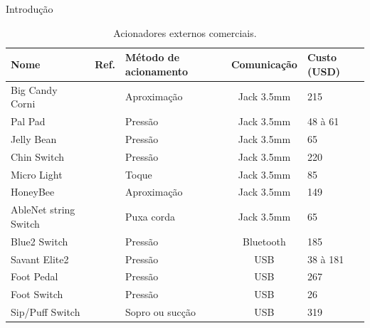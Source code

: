 \begin{chapter}{Introdução}
\begin{table}[!h]
\centering
\caption{Acionadores externos comerciais.}
\label{tab:acionadores}
\def\arraystretch{1.25}
\begin{tabular}{lcp{3cm}cp{3cm}}
	\hline
	\hline
	\textbf{Nome} & \textbf{Ref.} & \textbf{Método de acionamento} & \textbf{Comunicação} & \textbf{Custo (USD)} \\
	\hline
	Big Candy Corni&~\cite{CandyCorn}            & Aproximação  & Jack 3.5mm   & 215              \\
	Pal Pad&~\cite{PalPad}                       & Pressão      & Jack 3.5mm   &  48 à 61   \\
	Jelly Bean&~\cite{JellyBean}                 & Pressão      & Jack 3.5mm   &   65             \\
	Chin Switch&~\cite{Chin}                     & Pressão      & Jack 3.5mm   & 220              \\
	Micro Light&~\cite{MicroLight}               & Toque        & Jack 3.5mm   & 85               \\ 
	HoneyBee&~\cite{HoneyBee}                    & Aproximação  & Jack 3.5mm   & 149              \\
	AbleNet string Switch&~\cite{StringSwitch}   & Puxa corda & Jack 3.5mm & 65  \\
	Blue2 Switch&~\cite{Blue2}                   & Pressão      & Bluetooth    & 185              \\
	Savant Elite2&~\cite{SavantElite2}           & Pressão      & USB          & 38 à 181         \\
	Foot Pedal&~\cite{FootPedal}                 & Pressão      & USB          & 267              \\
	Foot Switch&~\cite{FootSwitch}               & Pressão      & USB          & 26               \\
	Sip/Puff Switch&~\cite{SipPuff}              & Sopro ou sucção & USB & 319  \\  
	
	\hline
	\hline
\end{tabular}
\end{table}


\end{chapter}
